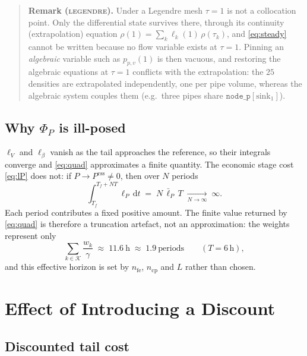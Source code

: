 \documentclass[11pt]{article}
\newcommand{\css}{\mathrm{css}}
\begin{document}
\begin{quote}\small
\textbf{Remark (\textsc{legendre}).} Under a Legendre mesh $\tau=1$ is not a
collocation point. Only the differential state survives there, through its
continuity (extrapolation) equation
$\rho(1)=\sum_k \ell_k(1)\,\rho(\tau_k)$, and \eqref{eq:steady} cannot be
written because no flow variable exists at $\tau=1$. Pinning an
\emph{algebraic} variable such as $p_{p,v}(1)$ is then vacuous, and restoring
the algebraic equations at $\tau=1$ conflicts with the extrapolation: the
$25$ densities are extrapolated independently, one per pipe volume, whereas
the algebraic system couples them (e.g.\ three pipes share
$\texttt{node\_p}[\mathrm{sink}_1]$).
\end{quote}

\subsection{Why $\Phi_P$ is ill-posed}

$\ell_V$ and $\ell_\beta$ vanish as the tail approaches the reference, so
their integrals converge and \eqref{eq:quad} approximates a finite quantity.
The economic stage cost \eqref{eq:lP} does not: if $P\to P^{\css}\neq 0$, then
over $N$ periods
%
\begin{equation}
  \int_{T_f}^{T_f+NT} \ell_P \,\mathrm{d}t \;=\; N\,\bar\ell_P\,T
  \;\xrightarrow[N\to\infty]{}\; \infty .
\end{equation}
%
Each period contributes a fixed positive amount. The finite value returned by
\eqref{eq:quad} is therefore a truncation artefact, not an approximation: the
weights represent only
%
\begin{equation}
  \sum_{k\in\mathcal{K}} \frac{w_k}{\gamma} \;\approx\; 11.6\ \text{h}
  \;\approx\; 1.9\ \text{periods}
  \qquad (T=6\,\text{h}),
\end{equation}
%
and this effective horizon is set by $n_{\mathrm{fe}}$, $n_{\mathrm{cp}}$ and
$L$ rather than chosen.

\section{Effect of Introducing a Discount}

\subsection{Discounted tail cost}
\end{document}
